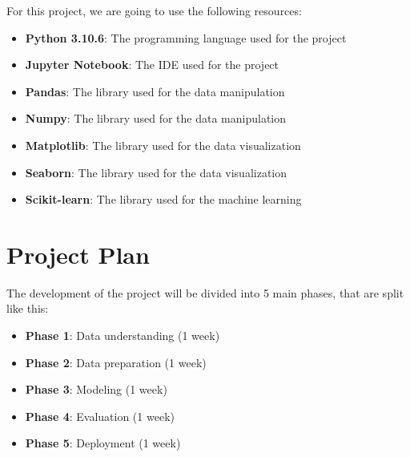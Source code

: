 For this project, we are going to use the following resources:

\begin{itemize}
    \item \textbf{Python 3.10.6}: The programming language used for the project
    \item \textbf{Jupyter Notebook}: The IDE used for the project
    \item \textbf{Pandas}: The library used for the data manipulation
    \item \textbf{Numpy}: The library used for the data manipulation
    \item \textbf{Matplotlib}: The library used for the data visualization
    \item \textbf{Seaborn}: The library used for the data visualization
    \item \textbf{Scikit-learn}: The library used for the machine learning 
\end{itemize}

\section{Project Plan}
\label{subsec:project_plan}

The development of the project will be divided into 5 main phases, that are split like this:

\begin{itemize}
    \item \textbf{Phase 1}: Data understanding (1 week)
    \item \textbf{Phase 2}: Data preparation (1 week)
    \item \textbf{Phase 3}: Modeling (1 week)
    \item \textbf{Phase 4}: Evaluation (1 week)
    \item \textbf{Phase 5}: Deployment (1 week)
\end{itemize}

\newpage